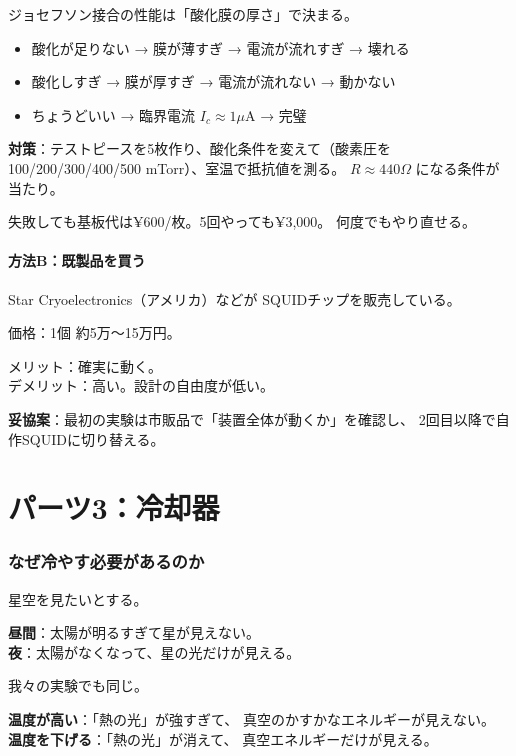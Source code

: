 \documentclass[12pt,a4paper]{article}
\begin{document}
\begin{abunaibox}
ジョセフソン接合の性能は「酸化膜の厚さ」で決まる。

\begin{itemize}
\item 酸化が足りない → 膜が薄すぎ → 電流が流れすぎ → 壊れる
\item 酸化しすぎ → 膜が厚すぎ → 電流が流れない → 動かない
\item ちょうどいい → 臨界電流 $I_c \approx 1 \mu$A → 完璧
\end{itemize}

\textbf{対策}：テストピースを5枚作り、酸化条件を変えて（酸素圧を
100/200/300/400/500 mTorr）、室温で抵抗値を測る。
$R \approx 440 \Omega$ になる条件が当たり。

失敗しても基板代は¥600/枚。5回やっても¥3,000。
何度でもやり直せる。
\end{abunaibox}

\subsection{方法B：既製品を買う}

\begin{kanenobox}[市販SQUIDチップ]
Star Cryoelectronics（アメリカ）などが
SQUIDチップを販売している。

価格：1個 約5万〜15万円。

メリット：確実に動く。\\
デメリット：高い。設計の自由度が低い。

\textbf{妥協案}：最初の実験は市販品で「装置全体が動くか」を確認し、
2回目以降で自作SQUIDに切り替える。
\end{kanenobox}

\part{パーツ3：冷却器}

\section{なぜ冷やす必要があるのか}

\begin{tatoebabox}
星空を見たいとする。

\textbf{昼間}：太陽が明るすぎて星が見えない。\\
\textbf{夜}：太陽がなくなって、星の光だけが見える。

我々の実験でも同じ。

\textbf{温度が高い}：「熱の光」が強すぎて、
真空のかすかなエネルギーが見えない。\\
\textbf{温度を下げる}：「熱の光」が消えて、
真空エネルギーだけが見える。
\end{tatoebabox}
\end{document}
